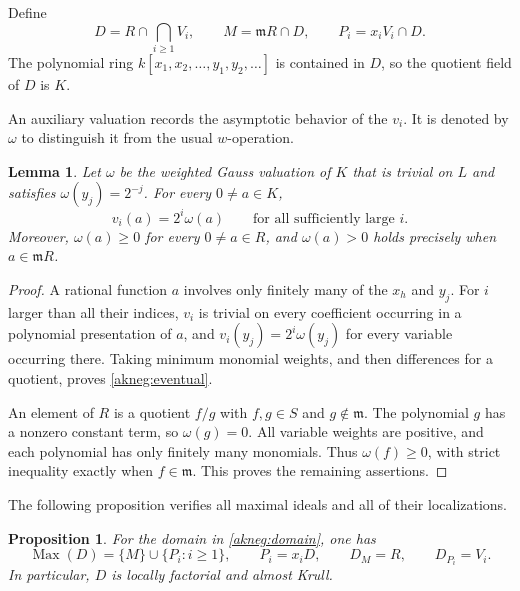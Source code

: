 \documentclass[11pt]{amsart}
\newtheorem{proposition}[proposition]{Proposition}
\newtheorem{lemma}[lemma]{Lemma}
\theoremstyle{definition}
\theoremstyle{remark}
\newcommand{\Max}{\operatorname{Max}}
\newcommand{\m}{\mathfrak m}
\begin{document}
Define
\begin{equation}\label{akneg:domain}
 D=R\cap\bigcap_{i\ge1}V_i,\qquad
 M=\m R\cap D,\qquad
 P_i=x_iV_i\cap D.
\end{equation}
The polynomial ring $k[x_1,x_2,\ldots,y_1,y_2,\ldots]$ is contained in
$D$, so the quotient field of $D$ is $K$.

An auxiliary valuation records the asymptotic behavior of the $v_i$.
It is denoted by $\omega$ to distinguish it from the usual $w$-operation.

\begin{lemma}\label{akneg:limit}
Let $\omega$ be the weighted Gauss valuation of $K$ that is trivial on
$L$ and satisfies $\omega(y_j)=2^{-j}$.  For every $0\ne a\in K$,
\begin{equation}\label{akneg:eventual}
 v_i(a)=2^i\omega(a)\qquad\text{for all sufficiently large }i.
\end{equation}
Moreover, $\omega(a)\ge0$ for every $0\ne a\in R$, and
$\omega(a)>0$ holds precisely when $a\in\m R$.
\end{lemma}

\begin{proof}
A rational function $a$ involves only finitely many of the $x_h$ and
$y_j$.  For $i$ larger than all their indices, $v_i$ is trivial on every
coefficient occurring in a polynomial presentation of $a$, and
$v_i(y_j)=2^i\omega(y_j)$ for every variable occurring there.  Taking
minimum monomial weights, and then differences for a quotient, proves
\eqref{akneg:eventual}.

An element of $R$ is a quotient $f/g$ with $f,g\in S$ and $g\notin\m$.
The polynomial $g$ has a nonzero constant term, so $\omega(g)=0$.
All variable weights are positive, and each polynomial has only finitely
many monomials.  Thus $\omega(f)\ge0$, with strict inequality exactly
when $f\in\m$.  This proves the remaining assertions.
\end{proof}

The following proposition verifies all maximal ideals and all of their
localizations.

\begin{proposition}\label{akneg:localizations}
For the domain in \eqref{akneg:domain}, one has
\begin{equation}\label{akneg:max}
 \Max(D)=\{M\}\cup\{P_i:i\ge1\},\qquad
 P_i=x_iD,\qquad D_M=R,\qquad D_{P_i}=V_i.
\end{equation}
In particular, $D$ is locally factorial and almost Krull.
\end{proposition}
\end{document}
